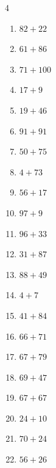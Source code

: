 \begin{multicols}{4}
\begin{enumerate}
  \item $82+22$
        \phantom{$=104$}

  \item $61+86$
        \phantom{$=147$}

  \item $71+100$
        \phantom{$=171$}

  \item $17+9$
        \phantom{$=26$}

  \item $19+46$
        \phantom{$=65$}

  \item $91+91$
        \phantom{$=182$}

  \item $50+75$
        \phantom{$=125$}

  \item $4+73$
        \phantom{$=77$}

  \item $56+17$
        \phantom{$=73$}

  \item $97+9$
        \phantom{$=106$}

  \item $96+33$
        \phantom{$=129$}

  \item $31+87$
        \phantom{$=118$}

  \item $88+49$
        \phantom{$=137$}

  \item $4+7$
        \phantom{$=11$}

  \item $41+84$
        \phantom{$=125$}

  \item $66+71$
        \phantom{$=137$}

  \item $67+79$
        \phantom{$=146$}

  \item $69+47$
        \phantom{$=116$}

  \item $67+67$
        \phantom{$=134$}

  \item $24+10$
        \phantom{$=34$}

  \item $70+24$
        \phantom{$=94$}

  \item $56+26$
        \phantom{$=82$}


\end{enumerate}
\end{multicols}
